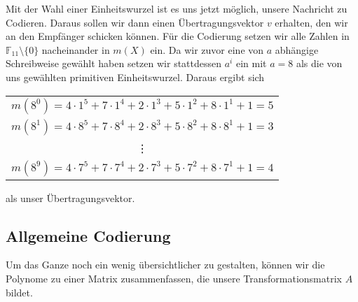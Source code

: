 Mit der Wahl einer Einheitswurzel ist es uns jetzt möglich, unsere Nachricht zu Codieren. Daraus sollen wir dann einen Übertragungsvektor $v$ erhalten, den wir an den Empfänger schicken können. 
Für die Codierung setzen wir alle Zahlen in $\mathbb{F}_{11}\setminus\{0\}$ nacheinander in $m(X)$ ein. Da wir zuvor eine von $a$ abhängige Schreibweise gewählt haben setzen wir stattdessen $a^i$ ein mit $a = 8$ als die von uns gewählten primitiven Einheitswurzel. Daraus ergibt sich
%
%
\begin{center}
	\begin{tabular}{c}
		$m(8^0) = 4 \cdot 1^5 + 7 \cdot 1^4 + 2 \cdot 1^3 + 5 \cdot 1^2 + 8 \cdot 1^1 + 1 = 5$ \\
		$m(8^1) = 4 \cdot 8^5 + 7 \cdot 8^4 + 2 \cdot 8^3 + 5 \cdot 8^2 + 8 \cdot 8^1 + 1 = 3$ \\
		\vdots \\
		$m(8^9) = 4 \cdot 7^5 + 7 \cdot 7^4 + 2 \cdot 7^3 + 5 \cdot 7^2 + 8 \cdot 7^1 + 1 = 4$
	\end{tabular}
\end{center}
als unser Übertragungsvektor. 

\subsection{Allgemeine Codierung
	\label{reedsolomon:subsection:algCod}}
Um das Ganze noch ein wenig übersichtlicher zu gestalten, können wir die Polynome zu einer Matrix zusammenfassen, die unsere Transformationsmatrix $A$ bildet.

